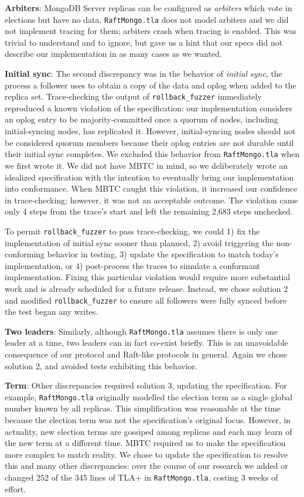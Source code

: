 \documentclass{vldb}
\begin{document}
\textbf{Arbiters}: MongoDB Server replicas can be configured as \textit{arbiters} which vote in elections but have no data. 
\texttt{RaftMongo.tla} does not model arbiters and we did not implement tracing for them; arbiters crash when tracing is enabled.
This was trivial to understand and to ignore, but gave us a hint that our specs did not describe our implementation in as many cases as we wanted.

\textbf{Initial sync}: The second discrepancy was in the behavior of \textit{initial sync}, the process a follower uses to obtain a copy of the data and oplog when added to the replica set.
Trace-checking the output of \texttt{rollback\_fuzzer} immediately reproduced a known violation of the specification: our implementation considers an oplog entry to be majority-committed once a quorum of nodes, including initial-syncing nodes, has replicated it.
However, initial-syncing nodes should not be considered quorum members because their oplog entries are not durable until their initial sync completes.
We excluded this behavior from \texttt{RaftMongo.tla} when we first wrote it.
We did not have MBTC in mind, so we deliberately wrote an idealized specification with the intention to eventually bring our implementation into conformance.
When MBTC caught this violation, it increased our confidence in trace-checking; however, it was not an acceptable outcome.
The violation came only 4 steps from the trace's start and left the remaining 2,683 steps unchecked.

To permit \texttt{rollback\_fuzzer} to pass trace-checking, we could 1) fix the implementation of initial sync sooner than planned, 2) avoid triggering the non-conforming behavior in testing, 3) update the specification to match today's implementation, or 4) post-process the traces to simulate a conformant implementation.
Fixing this particular violation would require more substantial work and is already scheduled for a future release.
Instead, we chose solution 2 and modified \texttt{rollback\_fuzzer} to ensure all followers were fully synced before the test began any writes.

\textbf{Two leaders}: Similarly, although \texttt{RaftMongo.tla} assumes there is only one leader at a time, two leaders can in fact co-exist briefly. This is an unavoidable consequence of our protocol and Raft-like protocols in general.
Again we chose solution 2, and avoided tests exhibiting this behavior.

\textbf{Term}: Other discrepancies required solution 3, updating the specification. 
For example, \texttt{RaftMongo.tla} originally modelled the election term as a single global number known by all replicas.
This simplification was reasonable at the time because the election term was not the specification's original focus. 
However, in actuality, new election terms are gossiped among replicas and each may learn of the new term at a different time.
MBTC required us to make the specification more complex to match reality. 
We chose to update the specification to resolve this and many other discrepancies: over the course of our research we added or changed 252 of the 345 lines of TLA+ in \texttt{RaftMongo.tla}, costing 3 weeks of effort.
\end{document}
